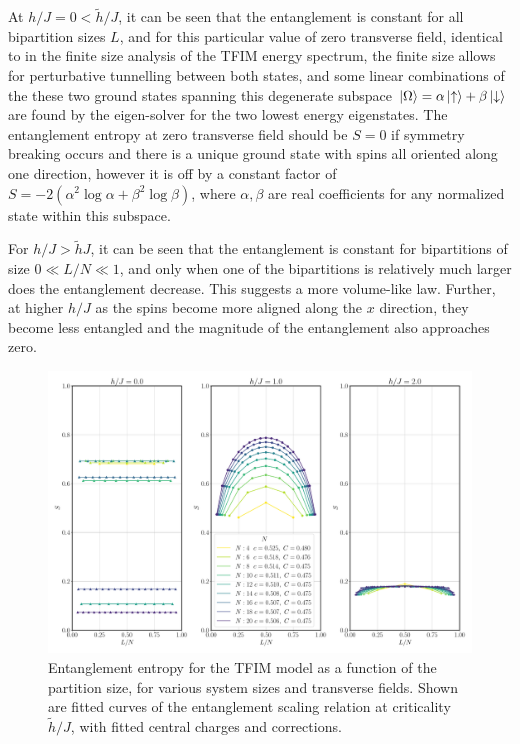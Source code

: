 \documentclass[12pt]{article}{}
\begin{document}
At $h/J = 0 < \tilde{h}/J$, it can be seen that the entanglement is constant for all bipartition sizes $L$, and for this particular value of zero transverse field, identical to in the finite size analysis of the TFIM energy spectrum, the finite size allows for perturbative tunnelling between both states, and some linear combinations of the these two ground states spanning this degenerate subspace $\ket{\Omega} = \alpha \ket{\uparrow} + \beta \ket{\downarrow}$ are found by the eigen-solver for the two lowest energy eigenstates. The entanglement entropy at zero transverse field should be $S = 0$ if symmetry breaking occurs and there is a unique ground state with spins all oriented along one direction, however it is off by a constant factor of $S = -2(\alpha^2\log\alpha + \beta^2\log\beta)$, where $\alpha,\beta$ are real coefficients for any normalized state within this subspace.

For $h/J > \tilde{h}{J}$, it can be seen that the entanglement is constant for bipartitions of size $0 \ll L/N \ll 1$, and only when one of the bipartitions is relatively much larger does the entanglement decrease. This suggests a more volume-like law. Further, at higher $h/J$ as the spins become more aligned along the $x$ direction, they become less entangled and the magnitude of the entanglement also approaches zero.

\begin{figure}[H]
  \centering
  \includegraphics[width=1\textwidth]{figures/ising/entanglement__partition__N.pdf}
  \caption{Entanglement entropy for the TFIM model as a function of the partition size, for various system sizes and transverse fields. Shown are fitted curves of the entanglement scaling relation at criticality $\tilde{h}/J$, with fitted central charges and corrections.}
  \label{fig:ising_entanglement_partition}
\end{figure}
\end{document}
